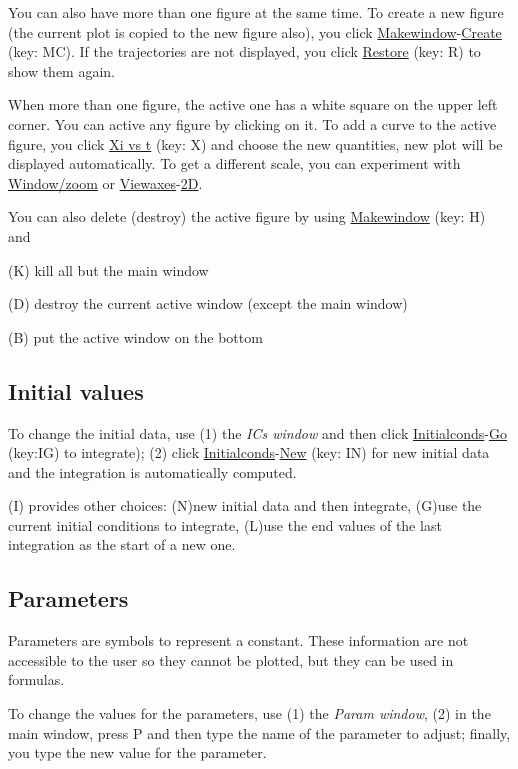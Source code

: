 You can also have more than one figure at the same time. To create a
new figure (the current plot is copied to the new figure also), you
click \underline{Makewindow}-\underline{Create} (key: MC). If the
trajectories are not displayed, you click \underline{Restore} (key: R)
to show them again.

When more than one figure, the active one has a white square on the
upper left corner. You can active any figure by clicking on it. To add
a curve to the active figure, you click \underline{Xi vs t} (key: X)
and choose the new quantities, new plot will be displayed
automatically. To get a different scale, you can experiment with
\underline{Window/zoom} or \underline{Viewaxes}-\underline{2D}.

You can also delete (destroy) the active figure by using
\underline{Makewindow} (key: H) and

(K) kill all but the main window

(D) destroy the current active window (except the main window)

(B) put the active window on the bottom


\subsection{Initial values}
\label{sec:initial-values}

To change the initial data, use (1) the {\it ICs window} and then
click \underline{Initialconds}-\underline{Go} (key:IG) to integrate);
(2) click \underline{Initialconds}-\underline{New} (key: IN) for new
initial data and the integration is automatically computed.

(I) provides other choices: (N)new initial data and then integrate,
(G)use the current initial conditions to integrate, (L)use the end
values of the last integration as the start of a new one.

\subsection{Parameters}
\label{sec:parameters}

Parameters are symbols to represent a constant. These information are
not accessible to the user so they cannot be plotted, but they can be
used in formulas. 

To change the values for the parameters, use (1) the
{\it Param window}, (2) in the main window, press P and then type the
name of the parameter to adjust; finally, you type the new value for
the parameter.



